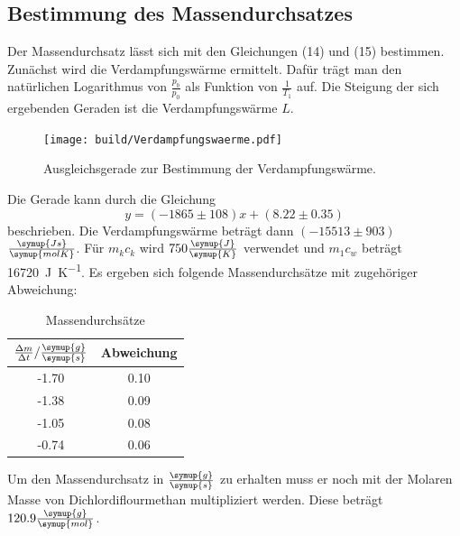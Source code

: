 \subsection{Bestimmung des Massendurchsatzes}
Der Massendurchsatz lässt sich mit den Gleichungen (14) und (15) bestimmen. Zunächst
wird die Verdampfungswärme ermittelt. Dafür trägt man den natürlichen Logarithmus von
$\frac{p_b}{p_0}$ als Funktion von $\frac{1}{T_1}$ auf. Die Steigung der sich ergebenden
Geraden ist die Verdampfungswärme $L$.
\begin{figure}[H]
  \centering
  \texttt{[image: build/Verdampfungswaerme.pdf]}
  \caption{Ausgleichsgerade zur Bestimmung der Verdampfungswärme.}
  \label{fig:Verdampfungswaerme}
\end{figure}
Die Gerade kann durch die Gleichung
\begin{equation}
  y = (-1865 \pm 108)x + (8.22 \pm 0.35)
\end{equation}
beschrieben.
Die Verdampfungswärme beträgt dann $(-15513 \pm 903)$ $\frac{\symup{Js}}{\symup{molK}}$.
Für $m_kc_k$ wird $750 \frac{\symup{J}}{\symup{K}}$ verwendet und $m_1c_w$ beträgt \SI{16720}{\joule\per\kelvin}.
Es ergeben sich folgende Massendurchsätze mit zugehöriger Abweichung:
\begin{table}
  \centering
  \caption{Massendurchsätze}
  \label{tab:Massendurchsätze}
  \begin{tabular}{c c}
    \toprule
    $\frac{\Delta m}{\Delta t}/\frac{\symup{g}}{\symup{s}}$ & Abweichung \\
    \midrule
    -1.70 & 0.10 \\
    -1.38 & 0.09 \\
    -1.05 & 0.08 \\
    -0.74 & 0.06 \\
    \bottomrule
  \end{tabular}
\end{table}
Um den Massendurchsatz in $\frac{\symup{g}}{\symup{s}}$ zu erhalten muss er noch
mit der Molaren Masse von Dichlordiflourmethan multipliziert werden.
Diese beträgt $120.9\frac{\symup{g}}{\symup{mol}}$.
